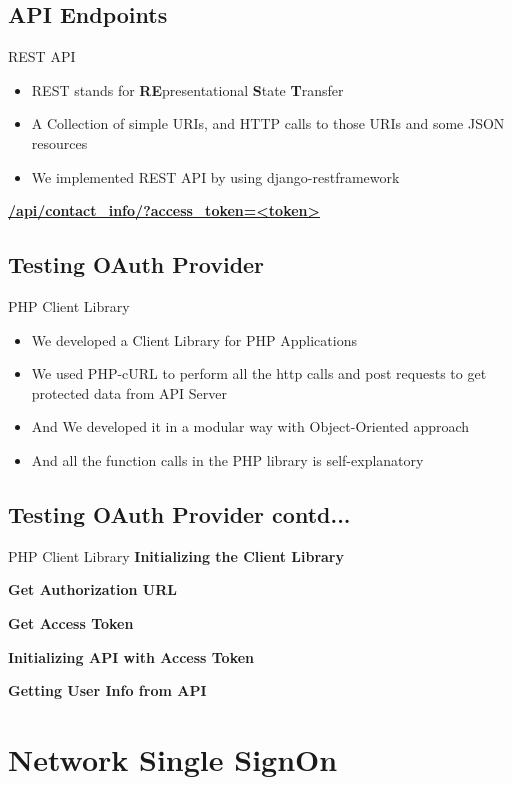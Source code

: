 \documentclass[10pt,xcolor=dvipsnames]{beamer}
\begin{document}
\subsection{API Endpoints}
\begin{frame}{REST API}
	\begin{itemize}
		\item REST stands for \textbf{RE}presentational \textbf{S}tate \textbf{T}ransfer
		\item A Collection of simple URIs, and HTTP calls to those URIs and some JSON resources
		\item We implemented REST API by using django-restframework
	\end{itemize}
	\textbf{\url{/api/contact_info/?access_token=<token>}}
	
\end{frame}

\subsection{Testing OAuth Provider}
\begin{frame}{PHP Client Library}
\begin{itemize}
	\item We developed a Client Library for PHP Applications
	\item We used PHP-cURL to perform all the http calls and post requests to get protected data from API Server
	\item And We developed it in a modular way with Object-Oriented approach
	\item And all the function calls in the PHP library is self-explanatory
\end{itemize}
\end{frame}

\subsection{Testing OAuth Provider contd...}
\begin{frame}{PHP Client Library}
\textbf{Initializing the Client Library}

\textbf{Get Authorization URL}

\textbf{Get Access Token}

\textbf{Initializing API with Access Token}

\textbf{Getting User Info from API}

\end{frame}
\section{Network Single SignOn}
\end{document}
